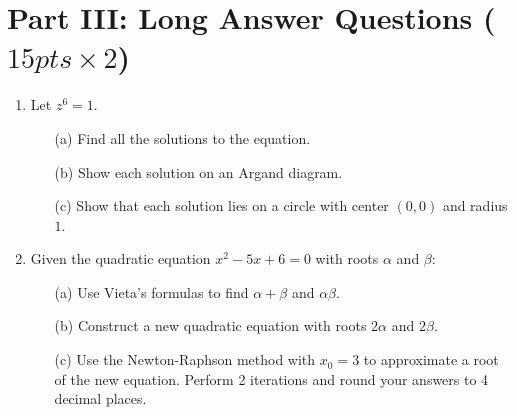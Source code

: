 \documentclass{sbs-exam}
\begin{document}
\section*{Part III: Long Answer Questions ($15 pts \times 2$)}
\begin{enumerate}

\item 
Let $ z^6 = 1$.  
\begin{enumerate}
\item[(a)] Find all the solutions to the equation.

\vspace{8cm} %

\item[(b)] Show each solution on an Argand diagram.

\vspace{4cm} %

\item[(c)] Show that each solution lies on a circle with center $(0, 0)$ and radius $1$.

\vspace{4cm} %
\end{enumerate}

\item 
Given the quadratic equation $ x^2 - 5x + 6 = 0 $ with roots $\alpha$ and $\beta$:
\begin{enumerate}
\item[(a)] Use Vieta's formulas to find $\alpha + \beta$ and $\alpha \beta$.

\vspace{3cm} %

\item[(b)] Construct a new quadratic equation with roots $2\alpha$ and $2\beta$.

\vspace{3cm} %

\item[(c)] Use the Newton-Raphson method with $x_0 = 3$ to approximate a root of the new equation. Perform 2 iterations and round your answers to 4 decimal places.

\vspace{5cm} %
\end{enumerate}
\end{enumerate}
\end{document}
